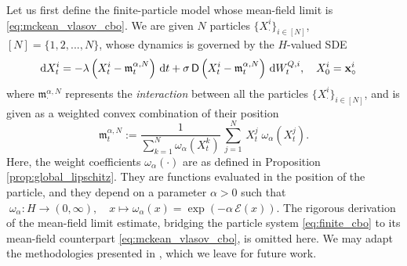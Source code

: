 \documentclass[12pt]{amsart}
\newcommand{\D}[1]{\mbox{\rm #1}}
\newcommand{\dd}{\D{d}}
\numberwithin{equation}{section}
\begin{document}
Let us first define the finite-particle model whose mean-field limit is \eqref{eq:mckean_vlasov_cbo}. 
We are given $N$ particles $\{X^{i}_{\cdot}\}_{i\in [N]}$, $[N]=\{1,2,...,N\}$, whose dynamics is governed by the $H$-valued SDE
\begin{equation}
\label{eq:finite_cbo}
\begin{aligned}
    & \dd X^{i}_t = -\lambda \left(X^{i}_t - \mathfrak{m}^{\alpha,N}_{t}\right)\,\dd t + \sigma\, \mathsf{D}\left(X^{i}_t - \mathfrak{m}^{\alpha,N}_{t}\right)\,\dd W_t^{Q,i}, \quad X^{i}_0 = \mathbf{x}^{i}_{\circ} 
\end{aligned}
\end{equation}
where $\mathfrak{m}^{\alpha,N}_{\cdot}$ represents the \textit{interaction} between all the particles $\{X^{i}_{\cdot}\}_{i\in [N]}$, and is given as a weighted convex combination of their position
\begin{equation}\label{consensus m}
    \mathfrak{m}^{\alpha,N}_{t} := \frac{1}{\sum\limits_{k=1}^{N}\omega_{\alpha}(X^{k}_{t})} \, \sum\limits_{j=1}^{N}\,X^{j}_{t}\; \omega_{\alpha}(X^{j}_{t}).
\end{equation}
Here, the weight coefficients $\omega_{\alpha}(\cdot)$ are as defined in Proposition \ref{prop:global_lipschitz}. They are functions evaluated in the position of the particle, and they depend on a parameter $\alpha>0$ such that $\;\omega_{\alpha}:H \to (0,\infty),\quad x\mapsto \omega_{\alpha}(x) = \exp(-\alpha\, \mathscr{E}(x)).$ The rigorous derivation of the mean-field limit estimate, bridging the particle system \eqref{eq:finite_cbo} to its mean-field counterpart \eqref{eq:mckean_vlasov_cbo}, is omitted here. We may adapt the methodologies presented in \cite{huang2022mean,huang2025uniform,bayraktar2025uniform,gerber2025uniform,gerber2023mean,choi2025modified}, which we leave for future work.
\end{document}
